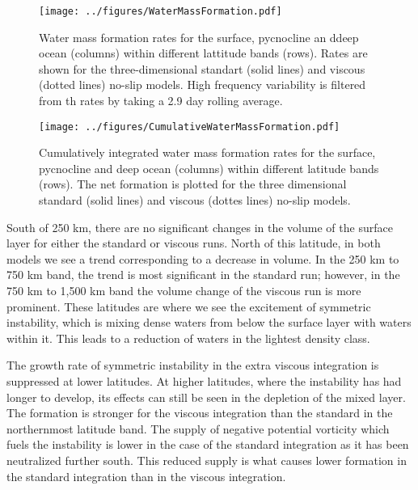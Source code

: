     \begin{figure} 
        \centering
        \texttt{[image: ../figures/WaterMassFormation.pdf]}
        \caption{Water mass formation rates for the surface, pycnocline an ddeep ocean (columns) within different lattitude bands (rows). Rates are shown for the three-dimensional standart (solid lines) and viscous (dotted lines) no-slip models. High frequency variability is filtered from th rates by taking a 2.9 day rolling average.}
        \label{fig:Camelid}
    \end{figure}

    \begin{figure} 
        \centering
        \texttt{[image: ../figures/CumulativeWaterMassFormation.pdf]}
        \caption{Cumulatively integrated water mass formation rates for the surface, pycnocline and deep ocean (columns) within different latitude bands (rows). The net formation is plotted for the three dimensional standard (solid lines) and viscous (dottes lines) no-slip models.}
        \label{fig:Camelid}
    \end{figure}

    South of 250 km, there are no significant changes in the volume of the surface layer for either the standard or viscous runs. North of this latitude, in both models we see a trend corresponding to a decrease in volume. In the 250 km to 750 km band, the trend is most significant in the standard run; however, in the 750 km to 1,500 km band the volume change of the viscous run is more prominent. These latitudes are where we see the excitement of symmetric instability, which is mixing dense waters from below the surface layer with waters within it. This leads to a reduction of waters in the lightest density class.
    
    The growth rate of symmetric instability in the extra viscous integration is suppressed at lower latitudes. At higher latitudes, where the instability has had longer to develop, its effects can still be seen in the depletion of the mixed layer. The formation is stronger for the viscous integration than the standard in the northernmost latitude band. The supply of negative potential vorticity which fuels the instability is lower in the case of the standard integration as it has been neutralized further south. This reduced supply is what causes lower formation in the standard integration than in the viscous integration.
    
